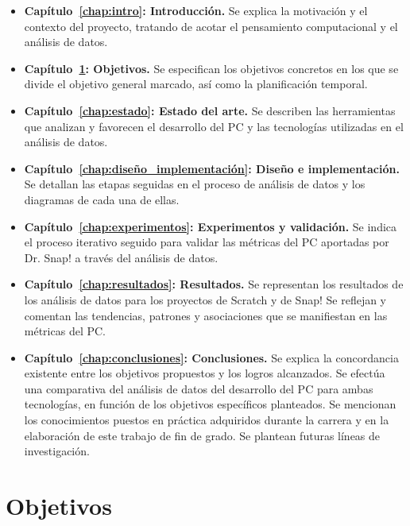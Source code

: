 \documentclass[a4paper, 12pt]{book}
\begin{document}
\begin{itemize}
    \item \textbf{Capítulo~\ref{chap:intro}: Introducción.} Se explica la motivación y el contexto del proyecto, tratando de acotar el pensamiento computacional y el análisis de datos.
    \item \textbf{Capítulo~\ref{chap:objetivos}: Objetivos.} Se especifican los objetivos concretos en los que se divide el objetivo general marcado, así como la planificación temporal.
    \item \textbf{Capítulo~\ref{chap:estado}: Estado del arte.} Se describen las herramientas que analizan y favorecen el desarrollo del PC y las tecnologías utilizadas en el análisis de datos.
    \item \textbf{Capítulo~\ref{chap:diseño_implementación}: Diseño e implementación.} Se detallan las etapas seguidas en el proceso de análisis de datos y los diagramas de cada una de ellas.
    \item \textbf{Capítulo~\ref{chap:experimentos}: Experimentos y validación.} Se indica el proceso iterativo seguido para validar las métricas del PC aportadas por Dr. Snap! a través del análisis de datos.
    \item \textbf{Capítulo~\ref{chap:resultados}: Resultados.} Se representan los resultados de los análisis de datos para los proyectos de Scratch y de Snap! Se reflejan y comentan las tendencias, patrones y asociaciones que se manifiestan en las métricas del PC. 
    \item \textbf{Capítulo~\ref{chap:conclusiones}: Conclusiones.} Se explica la concordancia existente entre los objetivos propuestos y los logros alcanzados. Se efectúa una comparativa del análisis de datos del desarrollo del PC para ambas tecnologías, en función de los objetivos específicos planteados. Se mencionan los conocimientos puestos en práctica adquiridos durante la carrera y en la elaboración de este trabajo de fin de grado. Se plantean futuras líneas de investigación. 
\end{itemize}




\cleardoublepage %
\chapter{Objetivos} 
\label{chap:objetivos} 
\end{document}
